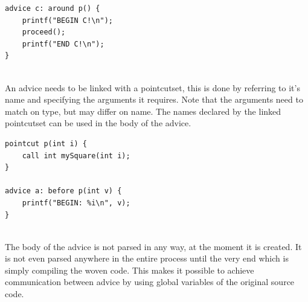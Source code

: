 \documentclass[a4paper]{report}
\begin{document}
\begin{minipage}{0.42\textwidth}
\begin{lstlisting}[caption=Example of an around advice, label=lst:SmallC_AroundAdvice]
advice c: around p() {
	printf("BEGIN C!\n");
	proceed();
	printf("END C!\n");
}
\end{lstlisting}
\end{minipage}
\\
An advice needs to be linked with a pointcutset, this is done by referring to it's name and specifying the arguments it requires. Note that the arguments need to match on type, but may differ on name. The names declared by the linked pointcutset can be used in the body of the advice.\\
\begin{minipage}{\linewidth}
\begin{lstlisting}[caption=Example of arguments.,label=lst:SmallC_Arguments]
pointcut p(int i) {
	call int mySquare(int i);
}

advice a: before p(int v) {
	printf("BEGIN: %i\n", v);
}
\end{lstlisting}
\end{minipage}\\
The body of the advice is not parsed in any way, at the moment it is created. It is not even parsed anywhere in the entire process until the very end which is simply compiling the woven code. This makes it possible to achieve communication between advice by using global variables of the original source code.
\end{document}
